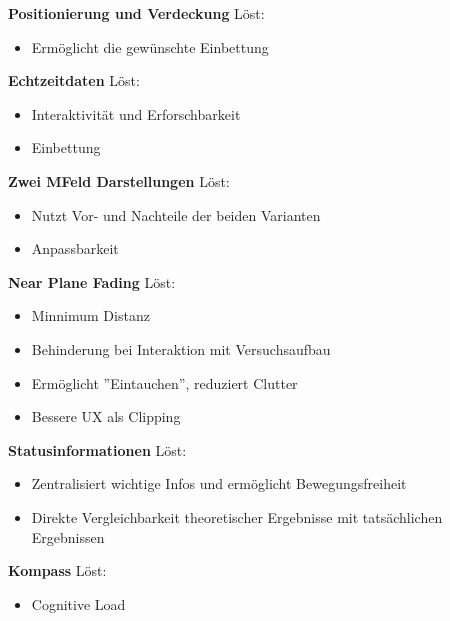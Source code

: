 \textbf{Positionierung und Verdeckung}
Löst:
\begin{itemize}
	\item Ermöglicht die gewünschte Einbettung
\end{itemize}

\textbf{Echtzeitdaten}
Löst:
\begin{itemize}
	\item Interaktivität und Erforschbarkeit
	\item Einbettung
\end{itemize}

\textbf{Zwei MFeld Darstellungen}
Löst: 
\begin{itemize}
	\item Nutzt Vor- und Nachteile der beiden Varianten
	\item Anpassbarkeit
\end{itemize}

\textbf{Near Plane Fading}
Löst: 
\begin{itemize}
	\item Minnimum Distanz
	\item Behinderung bei Interaktion mit Versuchsaufbau
	\item Ermöglicht ''Eintauchen'', reduziert Clutter
	\item Bessere UX als Clipping
\end{itemize}

\textbf{Statusinformationen}
Löst: 
\begin{itemize}
	\item Zentralisiert wichtige Infos und ermöglicht Bewegungsfreiheit
	\item Direkte Vergleichbarkeit theoretischer Ergebnisse mit tatsächlichen Ergebnissen
\end{itemize}

\textbf{Kompass}
Löst: 
\begin{itemize}
	\item Cognitive Load
\end{itemize}




